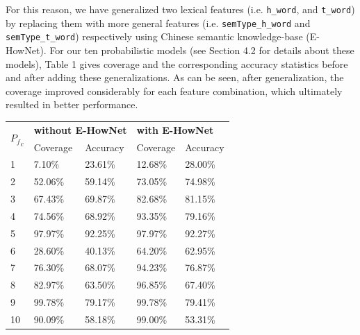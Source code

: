 \documentclass[11pt]{article}
\begin{document}
For this reason, we have generalized two lexical features (i.e. \verb+h_word+, and \verb+t_word+) by replacing them with more general features (i.e. \verb+semType_h_word+ and \verb+semType_t_word+) respectively using Chinese semantic knowledge-base (E-HowNet).
For our ten probabilistic models (see Section 4.2 for details about these models), Table 1 gives coverage and the corresponding accuracy statistics before and after adding these generalizations. As can be seen, after generalization, the coverage improved considerably for each feature combination, which ultimately resulted in better performance.
\begin{table}[!h]
\small
\begin{center}
\begin{tabular}{|l|l|l|l|l|}
\hline
\multirow{2}{*}{\bf${P_f}_c$} & \multicolumn{2}{|l}{{\bf without E-HowNet}} & \multicolumn{2}{|l|}{\bf with E-HowNet} \\ \cline{2-5} 
                  &   Coverage       &      Accuracy     &     Coverage       &     Accuracy      \\ \hline
   1              &    7.10\%       &    23.61\%       &   12.68\%         &        28.00\%   \\ 
   2              &    52.06\%      &     59.14\%      &   73.05\%         &        74.98\% \\ 
   3              &    67.43\%      &     69.87\%      &   82.68\%         &        81.15\%   \\ 
   4              &    74.56\%       &     68.92\%     &   93.35\%          &        79.16\%  \\ 
   5              &    97.97\%      &      92.25\%     &   97.97\%         &         92.27\%  \\ 
   6              &    28.60\%       &     40.13\%      &  64.20\%          &        62.95\%   \\ 
   7              &    76.30\%       &     68.07\%      &  94.23\%          &        76.87\%  \\ 
   8              &    82.97\%       &      63.50\%     &  96.85\%          &        67.40\%  \\ 
   9              &    99.78\%       &      79.17\%     &   99.78\%         &        79.41\%   \\ 
   10             &    90.09\%       &      58.18\%     &   99.00\%         &          53.31\% \\ \hline

\end{tabular}
\end{center}
\end{table}
\end{document}
